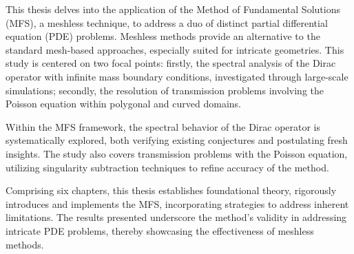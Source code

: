 \acresetall
\noindent
This thesis delves into the application of the Method of Fundamental Solutions (MFS), a meshless technique, to address a duo of distinct partial differential equation (\ac{PDE}) problems. Meshless methods provide an alternative to the standard mesh-based approaches, especially suited for intricate geometries. This study is centered on two focal points: firstly, the spectral analysis of the Dirac operator with infinite mass boundary conditions, investigated through large-scale simulations; secondly, the resolution of transmission problems involving the Poisson equation within polygonal and curved domains.

Within the MFS framework, the spectral behavior of the Dirac operator is systematically explored, both verifying existing conjectures and postulating fresh insights. The study also covers transmission problems with the Poisson equation, utilizing singularity subtraction techniques to refine accuracy of the method.

Comprising six chapters, this thesis establishes foundational theory, rigorously introduces and implements the MFS, incorporating strategies to address inherent limitations. The results presented underscore the method's validity in addressing intricate \ac{PDE} problems, thereby showcasing the effectiveness of meshless methods.